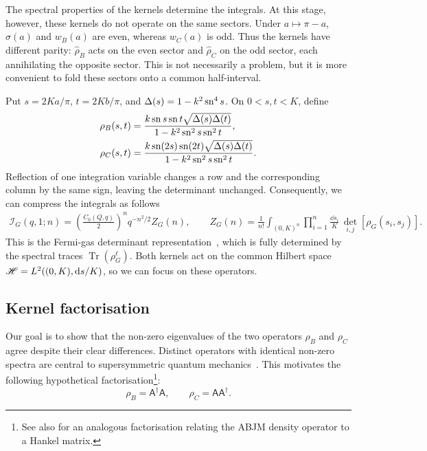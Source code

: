 The spectral properties of the kernels determine the integrals. At this stage,
however, these kernels do not operate on the same sectors. Under
$a\mapsto\pi-a$, $\sigma(a)$ and $w_B(a)$ are even, whereas $w_C(a)$ is odd.
Thus the kernels have different parity: $\widehat\rho_B$ acts on the even
sector and $\widehat\rho_C$ on the odd sector, each annihilating the opposite
sector. This is not necessarily a problem, but it is more convenient to fold
these sectors onto a common half-interval.

Put $s=2Ka/\pi$, $t=2Kb/\pi$, and $\Delta(s)=1-k^2\operatorname{sn}^4s$. On $0<s,t<K$, define
\begin{equation}
  \begin{aligned}
    \rho_B(s,t)&=\frac{k\operatorname{sn} s\operatorname{sn} t\sqrt{\Delta(s)\Delta(t)}}
    {1-k^2\operatorname{sn}^2s\operatorname{sn}^2t},\\
    \rho_C(s,t)&=\frac{k\operatorname{sn}(2s)\operatorname{sn}(2t)\sqrt{\Delta(s)\Delta(t)}}
    {1-k^2\operatorname{sn}^2s\operatorname{sn}^2t}.
  \end{aligned}
  \label{eq:half-kernel}
\end{equation}
Reflection of one integration variable changes a row and the corresponding
column by the same sign, leaving the determinant unchanged. Consequently,
we can compress the integrals as follows
\begin{equation}
  \begin{aligned}
    \mathcal I_G(q,1;n)
    =\left(\frac{C_0(Q,q)}2\right)^n q^{-n^2/2}Z_G(n), \qquad
    Z_G(n)=\frac1{n!}\int_{(0,K)^n}
    \prod_{i=1}^n\frac{\dd s_i}{K}\,
    \det_{i,j}\!\left[\rho_G(s_i,s_j)\right].
  \end{aligned}
  \label{eq:coefficient}
\end{equation}
This is the Fermi-gas determinant
representation~\cite{Bourdier:2015wda,Du:2023pbn}, which is fully determined by
the spectral traces $\operatorname{Tr}(\rho_G^\ell)$. Both kernels act on the
common Hilbert space $\mathscr H=L^2((0,K),\mathrm d s/K)$, so we can focus on these
operators.

\subsection{Kernel factorisation}

Our goal is to show that the non-zero eigenvalues of the two operators $\rho_B$
and $\rho_C$ agree despite their clear differences. Distinct operators with
identical non-zero spectra are central to supersymmetric quantum
mechanics~\cite{CooperKhareSukhatme:1995}. This motivates the following
hypothetical factorisation\footnote{
  See also \cite{Hatsuda:2012hm} for an analogous factorisation relating the
  ABJM density operator to a Hankel matrix.}:
\begin{equation}
  \rho_B=\mathsf A^\dagger\mathsf A,\qquad
  \rho_C=\mathsf A\mathsf A^\dagger.
  \label{eq:decomp}
\end{equation}

